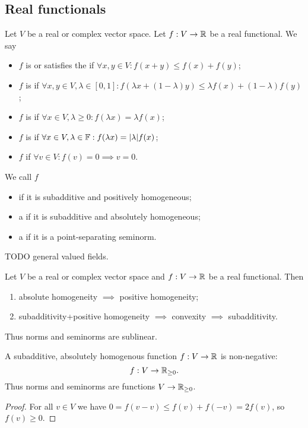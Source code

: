 \subsection{Real functionals}
\begin{definition}
Let $V$ be a real or complex vector space. Let $f: V\to \mathbb{R}$ be a real functional. We say
\begin{itemize}
\item $f$ is  or satisfies the  if $\forall x,y\in V: f(x+y) \leq f(x) + f(y)$;
\item $f$ is  if $\forall x,y\in V, \lambda\in[0,1]: f(\lambda x + (1-\lambda)y) \leq \lambda f(x) + (1-\lambda)f(y)$;
\item $f$ is  if $\forall x\in V,\lambda\geq 0: f(\lambda x) = \lambda f(x)$;
\item $f$ is  if $\forall x\in V,\lambda\in\mathbb{F}: f(\lambda x) = |\lambda| f(x)$;
\item $f$  if $\forall v\in V: f(v) = 0 \implies v = 0$.
\end{itemize}
We call $f$
\begin{itemize}
\item {} if it is subadditive and positively homogeneous;
\item a  if it is subadditive and absolutely homogeneous;
\item a  if it is a point-separating seminorm.
\end{itemize}
\end{definition}
TODO general valued fields.

\begin{lemma}
Let $V$ be a real or complex vector space and $f: V\to \mathbb{R}$ be a real functional. Then
\begin{enumerate}
\item absolute homogeneity $\implies$ positive homogeneity;
\item subadditivity+positive homogeneity $\implies$ convexity $\implies$ subadditivity.
\end{enumerate}
\end{lemma}
Thus norms and seminorms are sublinear.

\begin{lemma}
A subadditive, absolutely homogenous function $f:V\to \mathbb{R}$ is non-negative:
\[ f: V\to \mathbb{R}_{\geq 0}. \]
Thus norms and seminorms are functions $V\to \mathbb{R}_{\geq 0}$.
\end{lemma}
\begin{proof}
For all $v\in V$ we have $0 = f(v-v) \leq f(v)+f(-v) = 2f(v)$, so $f(v) \geq 0$.
\end{proof}

